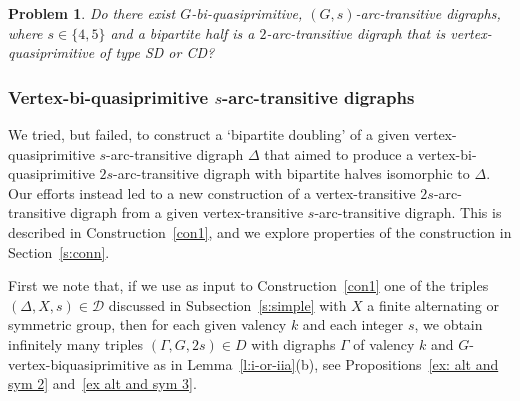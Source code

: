 \documentclass[11pt]{amsart}
\newtheorem{problem}{Problem}
\newcommand\DD{{\mathscr{D}}}
\begin{document}
\begin{problem}\label{p4}
    Do there exist \(G\)-bi-quasiprimitive, \((G,s)\)-arc-transitive digraphs, where $s\in\{4,5\}$ and a bipartite half is a  \(2\)-arc-transitive digraph that is vertex-quasiprimitive of type SD or CD?
\end{problem}




\subsubsection{ Vertex-bi-quasiprimitive \(s\)-arc-transitive digraphs} \label{sub:biqp}

We tried, but failed, to construct a `bipartite doubling' of a given vertex-quasiprimitive \(s\)-arc-transitive digraph $\Delta$ that aimed to produce a vertex-bi-quasiprimitive \(2s\)-arc-transitive digraph with bipartite halves isomorphic to $\Delta$. Our efforts instead led to a new construction of a vertex-transitive \(2s\)-arc-transitive digraph from a given vertex-transitive \(s\)-arc-transitive digraph. This is described in Construction~\ref{con1}, and we explore properties of the construction in Section~\ref{s:conn}. 

First we note that, if we use as input to Construction~\ref{con1} one of the triples $(\Delta,X,s)\in \DD$ discussed in Subsection~\ref{s:simple} with $X$ a finite alternating or symmetric group, then for each given valency $k$ and each integer $s$, we obtain infinitely many triples $(\Gamma,G,2s)\in D$ with digraphs $\Gamma$ of valency $k$ and $G$-vertex-biquasiprimitive as in Lemma~\ref{l:i-or-iia}(b), see Propositions~\ref{ex: alt and sym 2} and~\ref{ex alt and sym 3}. 
\end{document}
